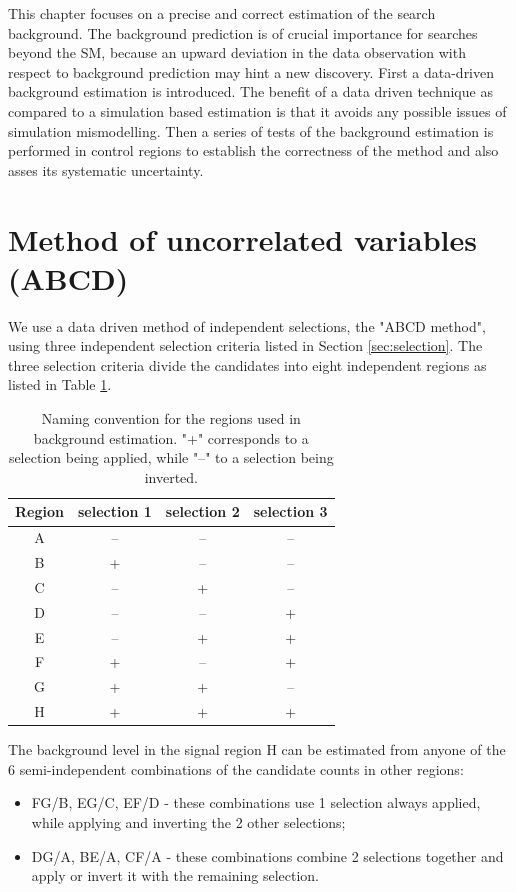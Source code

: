 This chapter focuses on a precise and correct estimation of the search background. The
background prediction is of crucial importance for searches beyond the SM, because an upward
deviation in the data observation with respect to background prediction may hint a new discovery.
First a data-driven background estimation is introduced. The benefit of a data driven technique
as compared to a simulation based estimation is that it avoids any possible issues of 
simulation mismodelling. Then a series of tests of the background estimation is performed 
in control regions to establish the correctness of the method and also asses
its systematic uncertainty.


\section{Method of uncorrelated variables (ABCD)}
\label{sec:abcd}
We use a data driven method of independent selections, the "ABCD method", using
 three independent selection criteria listed in Section \ref{sec:selection}. 
The three selection criteria divide the candidates into eight
independent regions as listed in Table \ref{tab:regions}.

\begin{table}[htbp]
\centering
\caption{Naming convention for the regions used in background estimation. "+" corresponds to a selection 
being applied, while "--" to a selection being inverted. \label{tab:regions}}
\begin{tabular}{cccc}
 \hline
  Region & selection 1 & selection 2 & selection 3 \\
 \hline
 A & -- & -- & -- \\
 B & + & -- & -- \\
 C & -- & + & -- \\
 D & -- & -- & + \\
 E & -- & + & + \\
 F & + & -- & + \\
 G & + & + & -- \\
 H & + & + & + \\
\hline
\end{tabular} 
\end{table}

The background level in the signal region H can be estimated from anyone of the 6 semi-independent combinations
of the candidate counts in other regions:
\begin{itemize}
\item FG/B, EG/C, EF/D - these combinations use 1 selection always applied, while applying and inverting the 
2 other selections;
\item DG/A, BE/A, CF/A - these combinations combine 2 selections together and apply or invert it with the 
remaining selection.
\end{itemize}

